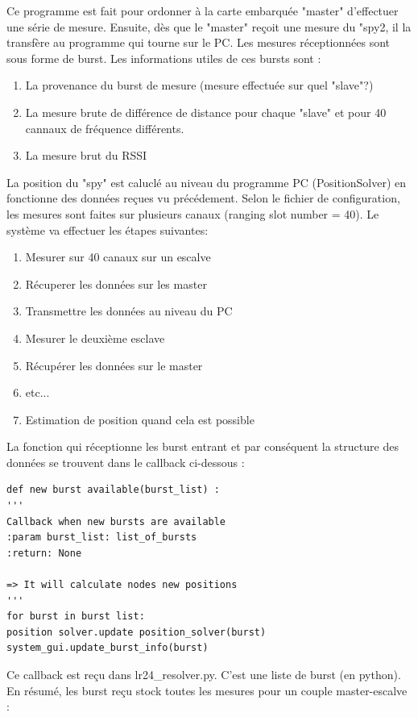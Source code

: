 Ce programme est fait pour ordonner à la carte embarquée "master" d'effectuer une série de mesure. Ensuite, dès que le "master" reçoit une mesure du "spy2, il la transfère au programme qui tourne sur le PC. Les mesures réceptionnées sont sous forme de burst. Les informations utiles de ces bursts sont : 

\begin{enumerate}
	\item La provenance du burst de mesure (mesure effectuée sur quel "slave"?)
	\item La mesure brute de différence de distance pour chaque "slave" et pour 40 cannaux de fréquence différents.
	\item La mesure brut du RSSI 
\end{enumerate}

La position du "spy" est caluclé au niveau du programme PC (PositionSolver) en fonctionne des données reçues vu précédement. Selon le fichier de configuration, les mesures sont faites sur plusieurs canaux (ranging slot number = 40). Le système va effectuer les étapes suivantes: 

\begin{enumerate}
	\item Mesurer sur 40 canaux sur un escalve
	\item Récuperer les données sur les master
	\item Transmettre les données au niveau du PC
	\item Mesurer le deuxième esclave
	\item Récupérer les données sur le master
	\item etc...
	\item Estimation de position quand cela est possible
\end{enumerate}

La fonction qui réceptionne les burst entrant et par conséquent la structure des données se trouvent dans le callback ci-dessous :

\begin{lstlisting}
def new burst available(burst_list) :
'''
Callback when new bursts are available
:param burst_list: list_of_bursts
:return: None

=> It will calculate nodes new positions
'''
for burst in burst list:
position solver.update position_solver(burst)
system_gui.update_burst_info(burst)
\end{lstlisting}

Ce callback est reçu dans lr24\_resolver.py. C'est une liste de burst (en python). En résumé, les burst reçu stock toutes les mesures pour un couple master-escalve :

